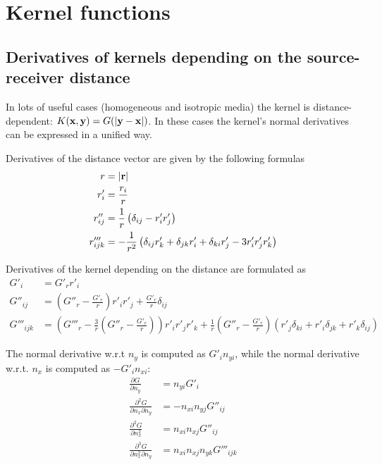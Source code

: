 \chapter{Kernel functions}

\section{Derivatives of kernels depending on the source-receiver distance}

In lots of useful cases (homogeneous and isotropic media) the kernel is distance-dependent: $K({\bf x}, {\bf y}) = G(|{\bf y} - {\bf x}|)$.
In these cases the kernel's normal derivatives can be expressed in a unified way.

Derivatives of the distance vector are given by the following formulas
%
\begin{align}
	r &= |{\bf r}| \\
	r'_i &= \frac{r_i}{r} \\
	r''_{ij} &= \frac{1}{r} \left( \delta_{ij} - r'_i r'_j \right) \\
	r'''_{ijk} &= -\frac{1}{r^2} \left(
		\delta_{ij} r'_k + \delta_{jk} r'_i + \delta_{ki} r'_j - 3 r'_i r'_j r'_k
	\right)
\end{align}

Derivatives of the kernel depending on the distance are formulated as
%
\begin{align}
	G'_i &= G'_r r'_i \\
	G''_{ij} &= \left(G''_r - \frac{G'_r}{r} \right) r'_i r'_j +  \frac{G'_r}{r} \delta_{ij} \\
	G'''_{ijk} &=
	\left(G'''_r -\frac{3}{r} \left(G''_r  - \frac{G'_r}{r} \right) \right) r'_i r'_j r'_k
	+  \frac{1}{r} \left( G''_r  - \frac{G'_r}{r} \right)\left(
	   r'_j \delta_{ki}
	+  r'_i \delta_{jk}
	+  r'_k \delta_{ij}
	\right)
	\label{eq:derivatives_wrt_ij}
\end{align}


The normal derivative w.r.t $n_y$ is computed as $G'_i n_{yi}$, while the normal derivative w.r.t. $n_x$ is computed as $-G'_i n_{xi}$:
%
\begin{align}
	\frac{\partial G}{\partial n_y} 
	&= n_{yi} G'_i
	\\
	\frac{\partial^2 G}{\partial n_x \partial n_y}
	&= -n_{xi} n_{yj} G''_{ij}
	\\
	\frac{\partial^2 G}{\partial n_x^2}
	&= n_{xi} n_{xj} G''_{ij}
	\\
	\frac{\partial^3 G}{\partial n_x^2 \partial n_y}
	&= n_{xi} n_{xj} n_{yk} G'''_{ijk}
\end{align}

